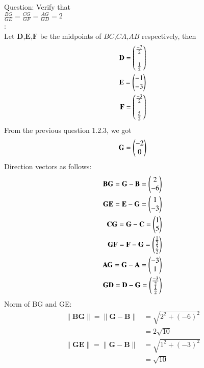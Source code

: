 \documentclass[journal,12pt,onecolumn]{IEEEtran}
\theoremstyle{remark}
\begin{document}
\let\vec\mathbf




\vspace{3cm}



\bigskip

\renewcommand{\thefigure}{\theenumi}
\renewcommand{\thetable}{\theenumi}
Question: Verify that\\
$\frac{BG}{GE}=\frac{CG}{GF}=\frac{AG}{GD}=2$\\
\solution:\\
Let $\vec{D}$,$\vec{E}$,$\vec{F}$ be the midpoints of $BC$,$CA$,$AB$ respectively, then
\begin{align}
\vec{D} = \myvec{\frac{-7}{2}\\\\\frac{1}{2}}\\
\vec{E} = \myvec{-1\\-3}\\
\vec{F} = \myvec{\frac{-3}{2}\\\\\frac{5}{2}}
\end{align}
From the previous question 1.2.3, we got
\begin{align}
\vec{G}=\myvec{-2\\0}
\end{align}
Direction vectors as follows: \\
\begin{align}
\vec{B}\vec{G}=\vec{G}-\vec{B}=\myvec{2\\-6}\\
\vec{G}\vec{E}=\vec{E}-\vec{G}=\myvec{1\\-3}\\
\vec{C}\vec{G}=\vec{G}-\vec{C}=\myvec{1\\5}\\
\vec{G}\vec{F}=\vec{F}-\vec{G}=\myvec{\frac{1}{2}\\\frac{5}{2}}\\
\vec{A}\vec{G}=\vec{G}-\vec{A}=\myvec{-3\\1}\\
\vec{G}\vec{D}=\vec{D}-\vec{G}=\myvec{\frac{-3}{2}\\\frac{1}{2}}
\end{align}
Norm of BG and GE:
\begin{align}
\|\mathbf{BG}\|=\|\mathbf{G-B}\|
              &=\sqrt{2^2+(-6)^2}\\
              &=2\sqrt{10}\\
\|\mathbf{GE}\|=\|\mathbf{G-B}\|
              &=\sqrt{1^2+(-3)^2}\\
              &=\sqrt{10}
\end{align}
\end{document}
